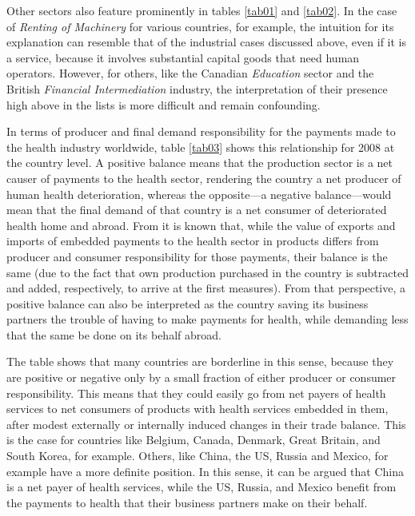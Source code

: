\documentclass[a4paper,12pt, ]{article}
\begin{document}
Other sectors also feature prominently in tables \ref{tab01} and \ref{tab02}. In the case of \textit{Renting of Machinery} for various countries, for example, the intuition for its explanation can resemble that of the industrial cases discussed above, even if it is a service,  because it involves substantial capital goods that need human operators. However, for others, like the Canadian \textit{Education} sector and the British \textit{Financial Intermediation} industry, the interpretation of their presence high above in the lists is more difficult and remain confounding.

In terms of producer and final demand responsibility for the payments made to the health industry worldwide, table \ref{tab03} shows this relationship for 2008 at the country level. A positive balance means that the production sector is a net causer of payments to the health sector, rendering the country a net producer of human health deterioration, whereas the opposite---a negative balance---would mean that the final demand of that country is a net consumer of deteriorated health home and abroad. From \citet{serranodietz2010} it is known that, while the value of exports and imports of embedded payments to the health sector in products differs from producer and consumer responsibility for those payments, their balance is the same (due to the fact that own production purchased in the country is subtracted and added, respectively, to arrive at the first measures). From that perspective, a positive balance can also be interpreted as the country saving its business partners the trouble of having to make payments for health, while demanding less that the same be done on its behalf abroad. 

The table shows that many countries are borderline in this sense, because they are positive or negative only by a small fraction of either producer or consumer responsibility. This means that they could easily go from net payers of health services to net consumers of products with health services embedded in them, after modest externally or internally induced changes in their trade balance. This is the case for countries like Belgium, Canada, Denmark, Great Britain, and South Korea, for example. Others, like China, the US, Russia and Mexico, for example have a more definite position. In this sense, it can be argued that China is a net payer of health services, while the US, Russia, and Mexico benefit from the payments to health that their business partners make on their behalf.
\end{document}
